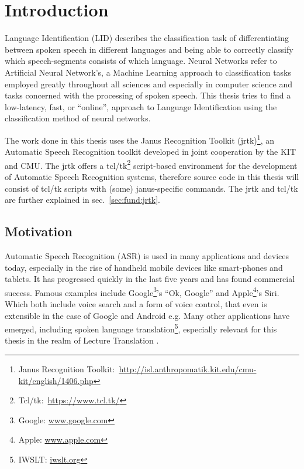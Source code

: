
\chapter{Introduction}
\label{ch:Introduction}
Language Identification (LID) describes the classification task of differentiating between spoken speech in different languages and being able to correctly classify which speech-segments consists of which language.  Neural Networks refer to Artificial Neural Network's, a Machine Learning approach to classification tasks employed greatly throughout all sciences and especially in computer science and tasks concerned with the processing of spoken speech. This thesis tries to find a low-latency, fast, or ``online'', approach to Language Identification using the classification method of neural networks.

The work done in this thesis uses the Janus Recognition Toolkit (jrtk)\footnote{Janus Recognition Toolkit:~\url{http://isl.anthropomatik.kit.edu/cmu-kit/english/1406.php}}, an Automatic Speech Recognition toolkit developed in joint cooperation by the KIT and CMU. The jrtk offers a tcl/tk\footnote{Tcl/tk:~\url{https://www.tcl.tk/}} script-based environment for the development of Automatic Speech Recognition systems, therefore source code in this thesis will consist of tcl/tk scripts with (some) janus-specific commands. The jrtk and tcl/tk are further explained in sec.~\ref{sec:fund:jrtk}.

\section{Motivation}
\label{sec:Introduction:Motivation}
Automatic Speech Recognition (ASR) is used in many applications and devices today, especially in the rise of handheld mobile devices like smart-phones and tablets. It has progressed quickly in the last five years and has found commercial success. Famous examples include Google\footnote{Google: \url{www.google.com}}'s ``Ok, Google'' and Apple\footnote{Apple: \url{www.apple.com}}'s Siri. Which both include voice search\cite{franz2008voice} and a form of voice control, that even is extensible in the case of Google and Android e.g\cite{voicecontrol2014}. Many other applications have emerged, including spoken language translation\footnote{IWSLT: \url{iwslt.org}}, especially relevant for this thesis in the realm of Lecture Translation\cite{lecturetranslator2016} .

